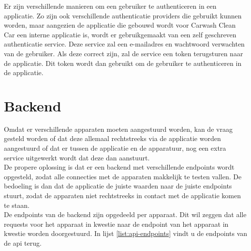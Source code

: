 Er zijn verschillende manieren om een gebruiker te authenticeren in een applicatie. Zo zijn ook verschillende authenticatie providers die gebruikt kunnen worden, maar aangezien de applicatie die gebouwd wordt voor Carwash Clean Car een interne applicatie is, wordt er gebruikgemaakt van een zelf geschreven authenticatie service. Deze service zal een e-mailadres en wachtwoord verwachten van de gebruiker. Als deze correct zijn, zal de service een token terugsturen naar de applicatie. Dit token wordt dan gebruikt om de gebruiker te authenticeren in de applicatie.

\section{Backend}
\label{sec:stand-van-zaken-backend}

Omdat er verschillende apparaten moeten aangestuurd worden, kan de vraag gesteld worden of dat deze allemaal rechtstreeks via de applicatie worden aangestuurd of dat er tussen de applicatie en de apparatuur, nog een extra service uitgewerkt wordt dat deze dan aanstuurt.\\

De propere oplossing is dat er een backend met verschillende endpoints wordt opgesteld, zodat alle connecties met de apparaten makkelijk te testen vallen. De bedoeling is dan dat de applicatie de juiste waarden naar de juiste endpoints stuurt, zodat de apparaten niet rechtstreeks in contact met de applicatie komen te staan.\\

De endpoints van de backend zijn opgedeeld per apparaat. Dit wil zeggen dat alle requests voor het apparaat in kwestie naar de endpoint van het apparaat in kwestie worden doorgestuurd. In lijst \ref{list:api-endpoints} vindt u de endpoints van de api terug.

